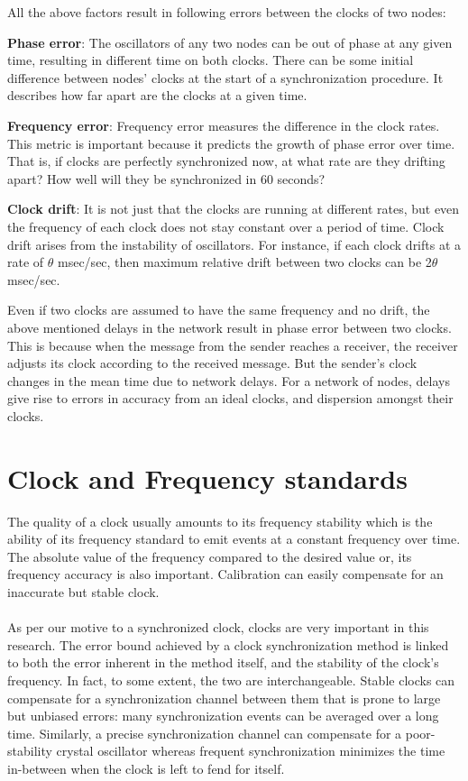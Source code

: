 \documentclass[a4paper,10pt]{report}
\begin{document}
      All the above factors result in following errors between the clocks of two nodes:
\begin{description}
\item \textbf{Phase error}: The oscillators of any two nodes can be out of phase at any given time, resulting in different time on both clocks. There can be some initial difference between nodes' clocks at the start of a synchronization procedure. It describes how far apart are the clocks at a given time.
\item \textbf{Frequency error}: Frequency error measures the difference in the clock rates. This metric is important because it predicts the growth of phase error over time. That is, if clocks are perfectly synchronized now, at what rate are they drifting apart? How well will they be synchronized in 60 seconds?
\item \textbf{Clock drift}: It is not just that the clocks are running at different rates, but even the frequency of each clock does not stay constant over a period of time. Clock drift arises from the instability of oscillators. For instance, if each clock drifts at a rate of $\theta$ msec/sec, then maximum relative drift between two clocks can be 2$\theta$ msec/sec.
\end{description}
Even if two clocks are assumed to have the same frequency and no drift, the above mentioned delays in the network result in phase
error between two clocks. This is because when the message from the sender reaches a receiver, the receiver adjusts its clock according
to the received message. But the sender's clock changes in the mean time due to network delays. For a network of nodes, delays give rise
to errors in accuracy from an ideal clocks, and dispersion amongst their clocks.
\section{\textbf{Clock and Frequency standards}}\par
The quality of a clock usually amounts to its frequency stability which is the ability of its frequency standard to emit
events at a constant frequency over time. The absolute value of the frequency compared to the desired value or, its frequency accuracy
is also important. Calibration can easily compensate for an inaccurate but stable clock.
\paragraph*{} As per our motive to a synchronized clock, clocks are very important in this research. The error bound achieved by a clock
synchronization method is linked to both the error inherent in the method itself, and the stability of the clock's frequency. In fact,
to some extent, the two are interchangeable. Stable clocks can compensate for a synchronization channel between them that is prone
to large but unbiased errors: many synchronization events can be averaged over a long time. Similarly, a precise synchronization
channel can compensate for a poor-stability crystal oscillator whereas frequent synchronization minimizes the time in-between when the
clock is left to fend for itself.
\end{document}

